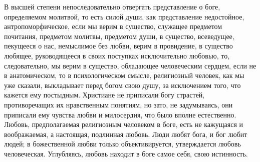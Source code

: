 \documentclass[12pt,oneside]{book}
\begin{document}
В высшей степени непоследовательно отвергать представление о боге, определяемом молитвой, то есть силой души, как представление недостойное, антропоморфическое, если мы верим в существо, служащее предметом почитания, предметом молитвы, предметом души, в существо, всеведущее, пекущееся о нас, немыслимое без любви, верим в провидение, в существо любящее, руководящееся в своих поступках исключительно любовью, то, следовательно, мы верим в существо, обладающее человеческим сердцем, если не в анатомическом, то в психологическом смысле, религиозный человек, как мы уже сказали, выкладывает перед богом свою душу, за исключением того, что кажется ему постыдным. Христиане не приписали богу страстей, противоречащих их нравственным понятиям, но зато, не задумываясь, они приписали ему чувства любви и милосердия, что было вполне естественно. Любовь, предполагаемая религиозным человеком в боге, есть не кажущаяся и воображаемая, а настоящая, подлинная любовь. Люди любят бога, и бог любит людей; в божественной любви только объективируется, утверждается любовь человеческая. Углубляясь, любовь находит в боге самое себя, свою истинность.
\end{document}
